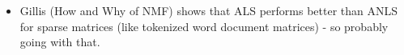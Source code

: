 \documentclass[12pt]{article}
\begin{document}
\begin{itemize}
    \item Gillis (How and Why of NMF) shows that ALS performs better than ANLS for sparse matrices (like tokenized word document matrices) - so probably going with that.
\end{itemize}
\end{document}
